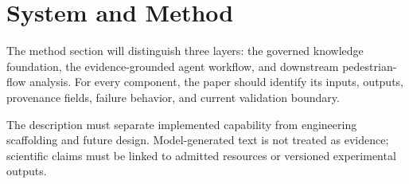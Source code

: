 \section{System and Method}

The method section will distinguish three layers: the governed knowledge foundation, the evidence-grounded agent workflow, and downstream pedestrian-flow analysis. For every component, the paper should identify its inputs, outputs, provenance fields, failure behavior, and current validation boundary.

The description must separate implemented capability from engineering scaffolding and future design. Model-generated text is not treated as evidence; scientific claims must be linked to admitted resources or versioned experimental outputs.
